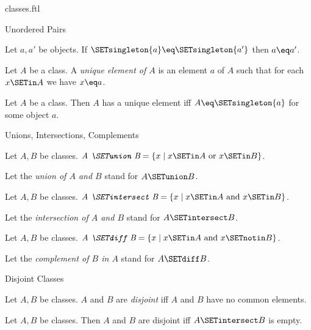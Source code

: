 \documentclass{naproche-library}
\begin{document}
\begin{smodule}[title=Classes]{classes.ftl}
\begin{sfragment}{Unordered Pairs}
  \begin{corollary}[forthel,id=FOUNDATIONS_01_6954678910713856]
    Let $a, a'$ be objects.
    If $\SETsingleton{a} \eq \SETsingleton{a'}$ then $a \eq a'$.
  \end{corollary}


  \begin{definition}[forthel,id=FOUNDATIONS_01_29867480293464351]
    Let $A$ be a class.
    A \emph{unique element of $A$} is an element $a$ of $A$ such that for each $x \SETin A$ we have $x \eq a$.
  \end{definition}

  \begin{proposition}[forthel,id=FOUNDATIONS_01_0166348647163481]
    Let $A$ be a class.
    Then $A$ has a unique element iff $A \eq \SETsingleton{a}$ for some object $a$.
  \end{proposition}
\end{sfragment}

\begin{sfragment}{Unions, Intersections, Complements}
  \begin{definition}[forthel,id=FOUNDATIONS_01_2159753924968448]
    Let $A, B$ be classes.
    $\emph{A \SETunion B} = \{ x \mid x \SETin A\text{ or }x \SETin B \}$.

    Let the \emph{union of $A$ and $B$} stand for $A \SETunion B$.
  \end{definition}

  \begin{definition}[forthel,id=FOUNDATIONS_01_5744033011859456]
    Let $A, B$ be classes.
    $\emph{A \SETintersect B} = \{ x \mid x \SETin A\text{ and }x \SETin B \}$.

    Let the \emph{intersection of $A$ and $B$} stand for $A \SETintersect B$.
  \end{definition}

  \begin{definition}[forthel,id=FOUNDATIONS_01_7620345041256448]
    Let $A, B$ be classes.
    $\emph{A \SETdiff B} = \{ x \mid x \SETin A\text{ and }x \SETnotin B \}$.

    Let the \emph{complement of $B$ in $A$} stand for $A \SETdiff B$.
  \end{definition}
\end{sfragment}

\begin{sfragment}{Disjoint Classes}
  \begin{definition}[forthel,id=FOUNDATIONS_01_4981913324355584]
    Let $A, B$ be classes.
    $A$ and $B$ are \emph{disjoint} iff $A$ and $B$ have no common elements.
  \end{definition}

  \begin{proposition}[forthel,id=FOUNDATIONS_01_1211191546347520]
    Let $A, B$ be classes.
    Then $A$ and $B$ are disjoint iff $A \SETintersect B$ is empty.
  \end{proposition}
\end{sfragment}
\end{smodule}
\end{document}

